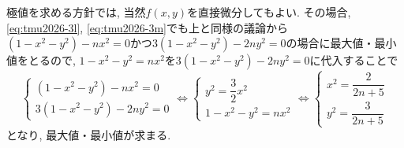 \documentclass[titlepage]{jsarticle}
\numberwithin{equation}{section}
\begin{document}
\begin{marker}
極値を求める方針では, 当然$f(x, y)$を直接微分してもよい. その場合, \eqref{eq:tmu2026-3l}, \eqref{eq:tmu2026-3m}でも上と同様の議論から$(1 - x^2 -y^2) - nx^2 = 0$かつ$3(1 - x^2 - y^2) - 2ny^2 = 0$の場合に最大値・最小値をとるので, $1 - x^2 -y^2 = nx^2$を$3(1 - x^2 - y^2) - 2ny^2 = 0$に代入することで
\[
\begin{cases}
(1 - x^2 -y^2) - nx^2 = 0\\
3(1 - x^2 - y^2) - 2ny^2 = 0
\end{cases}
\iff
\begin{cases}
y^2 = \dfrac{3}{2}x^2\\
1 -x^2 -y^2 = nx^2
\end{cases}
\iff
\begin{cases}
x^2 = \dfrac{2}{2n + 5}\\
y^2 = \dfrac{3}{2n+5}
\end{cases}
\]
となり, 最大値・最小値が求まる.
\end{marker}
\end{document}
